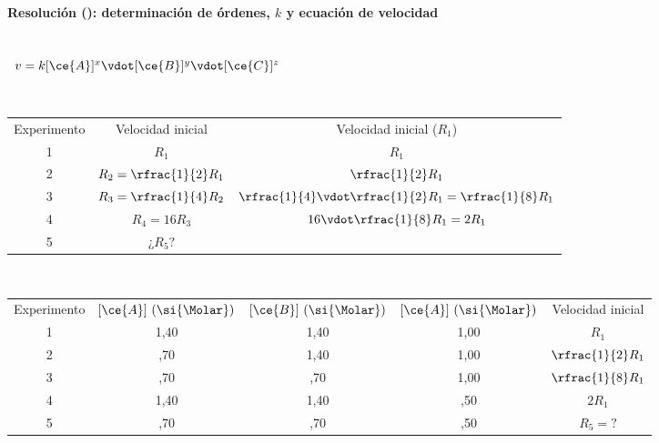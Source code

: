 \begin{frame}
	\frametitle{\ejerciciocmd}
	\framesubtitle{Resolución (): determinación de órdenes, $k$ y ecuación de velocidad}
	\quad{}\\
	~$v=k[\ce{A}]^x\vdot[\ce{B}]^y\vdot[\ce{C}]^z$
	\begin{overprint}
			\\[.3cm]
			\begin{center}
				\begin{tabular}{Scc}
					{Experimento} & {Velocidad inicial}		& {Velocidad inicial ($R_1$)} \\
					1			  & 		$R_1$           & $R_1$ \\
					2 			  & $R_2=\rfrac{1}{2} R_1$  & $\rfrac{1}{2}R_1$\\
					3			  & $R_3=\rfrac{1}{4} R_2$  & $\rfrac{1}{4}\vdot\rfrac{1}{2}R_1=\rfrac{1}{8}R_1$\\
					4			  & $R_4 = 16 R_3$			& $16\vdot\rfrac{1}{8}R_1=2R_1$\\
					5			  & ¿$R_5$?					& \\
				\end{tabular}
			\end{center}
			\\[.3cm]
			\begin{center}
				\begin{tabular}{SSSSc}
					{Experimento} & {$[\ce{A}]~(\si{\Molar})$} & {$[\ce{B}]~(\si{\Molar})$} & {$[\ce{A}]~(\si{\Molar})$} & {Velocidad inicial}   \\
					1		  & 		1,40			   &		1,40				& 			1,00			 & 		$R_1$            \\
					2 		  & 		 ,70			   & 		1,40				& 			1,00			 & $\rfrac{1}{2}R_1$\\
					3		  &			 ,70			   &		 ,70				& 			1,00			 & $\rfrac{1}{8}R_1$\\
					4		  &			1,40			   & 		1,40				& 			 ,50			 & $2R_1$		 \\
					5		  & 		 ,70			   &		 ,70				& 			 ,50			 & $R_5=?$				 \\
				\end{tabular}
			\end{center}
			\\

\end{overprint}
\end{frame}
